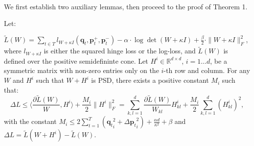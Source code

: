 \documentclass[twoside,11pt]{article}
\newcommand\mat[1]{{#1}}
\renewcommand\vec[1]{\mathbf{#1}}
\newcommand{\W}{\mat{W}}
\newcommand{\Hh}{\mat{H}}
\newcommand{\R}{\mathbb{R}}
\newcommand{\tL}{\tilde{L}(\W)}
\newcommand{\frobsq}[1]{{\|#1\|_F^2}}
\newcommand{\q}{{\vec{q}}}
\newcommand{\trip}{{t}}
\newcommand{\qt}{{\q_{\trip}}}
\newcommand{\grd}{\frac{\partial \tL}{\W}}
\newcommand{\grdkl}{\frac{\partial \tL}{\W_{kl}}}
\begin{document}
We first establish two auxiliary lemmas, then proceed to the proof of Theorem 1.
\label{appendix-proofs}
\begin{lemma}
\label{lem:smooth}

Let:

$\tL=\sum\limits_{t\in T}{l_{\W + \kappa I}(\vec{q}_t, \vec{p}_{t}^{+}, \vec{p}_{t}^{-})} -
\alpha \cdot \log \det(\W + \kappa I) + \tfrac{\beta}{2}  \cdot \| \W + \kappa I \|_{F}^{2}$, 
where $l_{\W + \kappa I}$ is either the squared hinge loss or the log-loss, and $\tL$ is defined over the positive semidefininte cone. 
Let $\Hh^i \in \R^{d \times d}$, $i=1 \ldots d$, be a symmetric matrix with non-zero entries only on the $i$-th row and column.
For any $\W$ and $\Hh^i$ such that $\W + \Hh^i$ is PSD, there exists a positive constant $M_i$ such that:
\begin{equation}
\label{eq:ineq}
\Delta L \leq  \langle \grd, \Hh^i \rangle + \frac{M_i}{2} \frobsq{\Hh^i} = \sum_{k,l=1}^d  \grdkl \Hh_{kl}^i + \frac{M_i}{2} \sum_{k,l=1}^d  (\Hh_{kl}^i)^2, \nonumber
\end{equation}
with the constant $M_i \leq  2 \sum_{t=1}^T (\qt_i^2 +{\Delta\vec{p}_{t}}_i^2) + \frac{\alpha d}{\kappa ^2} + \beta$ and $\Delta L = \tilde{L}(\W + \Hh^i) - \tL$.
\end{lemma}
\end{document}
